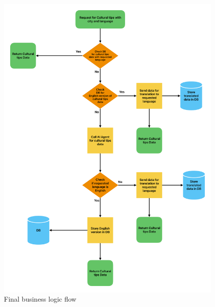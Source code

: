 \begin{figure}[H]
    \centering
    \includegraphics[width=1\linewidth]{chapter/05_implementation/backend/B_architectural_design/Business_Logic_Flow.pdf}
    \caption{Final business logic flow}
    \label{fig:backend_business_logic _flow}
\end{figure}